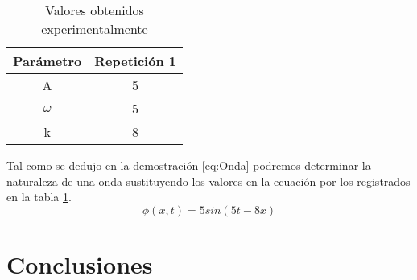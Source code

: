 \documentclass{article}
\begin{document}
	\begin{table}
		\centering
		\begin{tabular}{cc}
			\hline
			Parámetro & Repetición 1\\
			\hline
			A & 5\\
			$\omega$ & 5\\
			k & 8\\		
		\end{tabular}
	
	\caption{Valores obtenidos experimentalmente}
	\label{tab:exp}
	\end{table}

	
	Tal como se dedujo en la demostración \eqref{eq:Onda} podremos determinar la naturaleza de una onda sustituyendo los valores en la ecuación por los registrados en la tabla \ref{tab:exp}.
	$$
	\phi (x,t) = 5 sin (5t - 8x)
	$$
	\newpage
	\section{Conclusiones}
	\lipsum[1]
	
	
	
	
\end{document}
